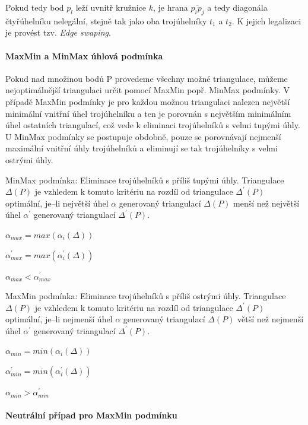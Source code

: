 \documentclass[12pt,a4paper]{article}
\begin{document}
Pokud tedy bod $p_l$ leží uvnitř kružnice $k$, je hrana $\overline{p_ip_j}$ a tedy diagonála čtyřúhelníku nelegální, stejně tak jako oba trojúhelníky $t_1$ a $t_2$. K jejich legalizaci je provést tzv. \emph{Edge swaping}.

\paragraph{MaxMin a MinMax úhlová podmínka}\cite{TB1}

Pokud nad množinou bodů P provedeme všechny možné triangulace, můžeme nejoptimálnější triangulaci určit pomocí MaxMin popř. MinMax podmínky. V případě MaxMin podmínky je pro každou možnou triangulaci nalezen největší minimální vnitřní úhel trojúhelníku a ten je porovnán s největším minimálním úhel ostatních triangulací, což vede k eliminaci trojúhelníků s velmi tupými úhly. U MinMax podmínky se postupuje obdobně, pouze se porovnávají nejmenší maximální vnitřní úhly trojúhelníků a eliminují se tak trojúhelníky s velmi ostrými úhly.

\newpage
MinMax podmínka:
Eliminace trojúhelníků s příliš tupými úhly. Triangulace $\Delta(P)$ je vzhledem k tomuto kritériu na rozdíl od triangulace $\Delta^{'}(P)$ optimální, je–li největší úhel $\alpha$ generovaný triangulací $\Delta(P)$ menší než největší úhel $\alpha^{'}$ generovaný triangulací $\Delta^{'}(P)$.
\begin{center}
$\alpha_{max} = max(\alpha_i(\Delta))$

$\alpha^{'}_{max} = max(\alpha_i^{'}(\Delta))$

$\alpha_{max} < \alpha^{'}_{max}$
\end{center}

\bigskip
MaxMin podmínka:
Eliminace trojúhelníků s příliš ostrými úhly. Triangulace $\Delta(P)$ je vzhledem k tomuto kritériu na rozdíl od triangulace $\Delta^{'}(P)$ optimální, je–li nejmenší úhel $\alpha$ generovaný triangulací $\Delta(P)$ větší než nejmenší úhel $\alpha^{'}$ generovaný triangulací $\Delta^{'}(P)$.
\begin{center}
$\alpha_{min} = min(\alpha_i(\Delta))$

$\alpha^{'}_{min} = min(\alpha_i^{'}(\Delta))$

$\alpha_{min} > \alpha^{'}_{min}$
\end{center}

\paragraph{Neutrální případ pro MaxMin podmínku}
\end{document}
